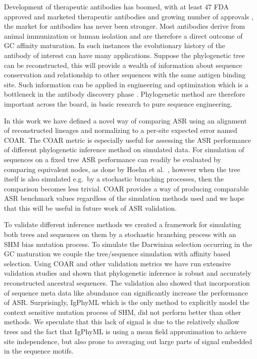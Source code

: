 Development of therapeutic antibodies has boomed, with at least 47 FDA approved and marketed therapeutic antibodies and growing number of approvals \cite{ecker2015therapeutic}, the market for antibodies has never been stronger.
Most antibodies derive from animal immunization or human isolation \cite{reichert2012marketed} and are therefore a direct outcome of GC affinity maturation.
In such instances the evolutionary history of the antibody of interest can have many applications.
Suppose the phylogenetic tree can be reconstructed, this will provide a wealth of information about sequence conservation and relationship to other sequences with the same antigen binding site.
Such information can be applied in engineering and optimization which is a bottleneck in the antibody discovery phase \cite{dubel2014handbook}.
Phylogenetic method are therefore important across the board, in basic research to pure sequence engineering.

In this work we have defined a novel way of comparing ASR using an alignment of reconstructed lineages and normalizing to a per-site expected error named COAR.
The COAR metric is especially useful for assessing the ASR performance of different phylogenetic inference method on simulated data.
For simulation of sequences on a fixed tree ASR performance can readily be evaluated by comparing equivalent nodes, as done by Hoehn et al.\ \cite{Hoehn2016-wg}, however when the tree itself is also simulated e.g.\ by a stochastic branching processes, then the comparison becomes less trivial.
COAR provides a way of producing comparable ASR benchmark values regardless of the simulation methods used and we hope that this will be useful in future work of ASR validation.

To validate different inference methods we created a framework for simulating both trees and sequences on them by a stochastic branching process with an SHM bias mutation process.
To simulate the Darwinian selection occurring in the GC maturation we couple the tree/sequence simulation with affinity based selection.
Using COAR and other validation metrics we have run extensive validation studies and shown that phylogenetic inference is robust and accurately reconstructed ancestral sequences.
The validation also showed that incorporation of sequence meta data like abundance can significantly increase the performance of ASR.
Surprisingly, IgPhyML which is the only method to explicitly model the context sensitive mutation process of SHM, did not perform better than other methods.
We speculate that this lack of signal is due to the relatively shallow trees and the fact that IgPhyML is using a mean field approximation to achieve site independence, but also prone to averaging out large parts of signal embedded in the sequence motifs.


